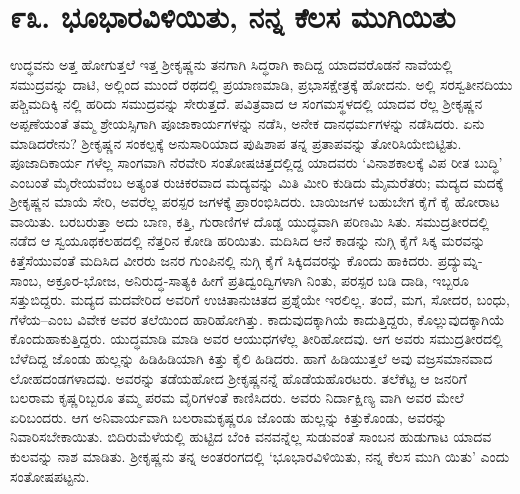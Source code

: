 
\chapter{೯೩. ಭೂಭಾರವಿಳಿಯಿತು, ನನ್ನ ಕೆಲಸ ಮುಗಿಯಿತು}

ಉದ್ಧವನು ಅತ್ತ ಹೋಗುತ್ತಲೆ ಇತ್ತ ಶ್ರೀಕೃಷ್ಣನು ತನಗಾಗಿ ಸಿದ್ಧರಾಗಿ ಕಾದಿದ್ದ ಯಾದವರೊಡನೆ ನಾವೆಯಲ್ಲಿ ಸಮುದ್ರವನ್ನು ದಾಟಿ, ಅಲ್ಲಿಂದ ಮುಂದೆ ರಥದಲ್ಲಿ ಪ್ರಯಾಣಮಾಡಿ, ಪ್ರಭಾಸಕ್ಷೇತ್ರಕ್ಕೆ ಹೋದನು. ಅಲ್ಲಿ ಸರಸ್ವತೀನದಿಯು ಪಶ್ಚಿಮದಿಕ್ಕಿ ನಲ್ಲಿ ಹರಿದು ಸಮುದ್ರವನ್ನು ಸೇರುತ್ತದೆ. ಪವಿತ್ರವಾದ ಆ ಸಂಗಮಸ್ಥಳದಲ್ಲಿ ಯಾದವ ರೆಲ್ಲ ಶ್ರೀಕೃಷ್ಣನ ಅಪ್ಪಣೆಯಂತೆ ತಮ್ಮ ಶ್ರೇಯಸ್ಸಿಗಾಗಿ ಪೂಜಾಕಾರ್ಯಗಳನ್ನು ನಡೆಸಿ, ಅನೇಕ ದಾನಧರ್ಮಗಳನ್ನು ನಡೆಸಿದರು. ಏನು ಮಾಡಿದರೇನು? ಶ್ರೀಕೃಷ್ಣನ ಸಂಕಲ್ಪಕ್ಕೆ ಅನುಸಾರಿಯಾದ ಪುಷಿಶಾಪ ತನ್ನ ಪ್ರತಾಪವನ್ನು ತೋರಿಸಿಯೇಬಿಟ್ಟಿತು. ಪೂಜಾದಿಕಾರ್ಯ ಗಳೆಲ್ಲ ಸಾಂಗವಾಗಿ ನೆರವೇರಿ ಸಂತೋಷಚಿತ್ತದಲ್ಲಿದ್ದ ಯಾದವರು ‘ವಿನಾಶಕಾಲಕ್ಕೆ ವಿಪ ರೀತ ಬುದ್ಧಿ’ ಎಂಬಂತೆ ಮೈರೇಯವೆಂಬ ಅತ್ಯಂತ ರುಚಿಕರವಾದ ಮದ್ಯವನ್ನು ಮಿತಿ ಮೀರಿ ಕುಡಿದು ಮೈಮರೆತರು; ಮದ್ಯದ ಮದಕ್ಕೆ ಶ್ರೀಕೃಷ್ಣನ ಮಾಯೆ ಸೇರಿ, ಅವರೆಲ್ಲ ಪರಸ್ಪರ ಜಗಳಕ್ಕೆ ಪ್ರಾರಂಭಿಸಿದರು. ಬಾಯಿಜಗಳ ಬಹುಬೇಗ ಕೈಗೆ ಕೈ ಹೋರಾಟ ವಾಯಿತು. ಬರಬರುತ್ತಾ ಅದು ಬಾಣ, ಕತ್ತಿ, ಗುರಾಣಿಗಳ ದೊಡ್ಡ ಯುದ್ಧವಾಗಿ ಪರಿಣಮಿ ಸಿತು. ಸಮುದ್ರತೀರದಲ್ಲಿ ನಡೆದ ಆ ಸ್ವಯೂಥಕಲಹದಲ್ಲಿ ನೆತ್ತರಿನ ಕೋಡಿ ಹರಿಯಿತು. ಮದಿಸಿದ ಆನೆ ಕಾಡನ್ನು ನುಗ್ಗಿ ಕೈಗೆ ಸಿಕ್ಕ ಮರವನ್ನು ಕಿತ್ತೆಸೆಯುವಂತೆ ಮದಿಸಿದ ವೀರರು ಜನರ ಗುಂಪಿನಲ್ಲಿ ನುಗ್ಗಿ ಕೈಗೆ ಸಿಕ್ಕಿದವರನ್ನು ಕೊಂದು ಹಾಕಿದರು. ಪ್ರದ್ಯುಮ್ನ-ಸಾಂಬ, ಅಕ್ರೂರ-ಭೋಜ, ಅನಿರುದ್ಧ-ಸಾತ್ಯಕಿ ಹೀಗೆ ಪ್ರತಿದ್ವಂದ್ವಿಗಳಾಗಿ ನಿಂತು, ಪರಸ್ಪರ ಬಡಿ ದಾಡಿ, ಇಬ್ಬರೂ ಸತ್ತುಬಿದ್ದರು. ಮದ್ಯದ ಮದವೇರಿದ ಅವರಿಗೆ ಉಚಿತಾನುಚಿತದ ಪ್ರಶ್ನೆಯೇ ಇರಲಿಲ್ಲ. ತಂದೆ, ಮಗ, ಸೋದರ, ಬಂಧು, ಗೆಳೆಯ–ಎಂಬ ವಿವೇಕ ಅವರ ತಲೆಯಿಂದ ಹಾರಿಹೋಗಿತ್ತು. ಕಾದುವುದಕ್ಕಾಗಿಯೆ ಕಾದುತ್ತಿದ್ದರು, ಕೊಲ್ಲುವುದಕ್ಕಾಗಿಯೆ ಕೊಂದುಹಾಕುತ್ತಿದ್ದರು. ಯುದ್ಧಮಾಡಿ ಮಾಡಿ ಅವರ ಆಯುಧಗಳೆಲ್ಲ ತೀರಿಹೋದವು. ಆಗ ಅವರು ಸಮುದ್ರತೀರದಲ್ಲಿ ಬೆಳೆದಿದ್ದ ಜೊಂಡು ಹುಲ್ಲನ್ನು ಹಿಡಿಹಿಡಿಯಾಗಿ ಕಿತ್ತು ಕೈಲಿ ಹಿಡಿದರು. ಹಾಗೆ ಹಿಡಿಯುತ್ತಲೆ ಅವು ವಜ್ರಸಮಾನವಾದ ಲೋಹದಂಡಗಳಾದವು. ಅವರನ್ನು ತಡೆಯಹೋದ ಶ್ರೀಕೃಷ್ಣನನ್ನೆ ಹೊಡೆಯಹೊರಟರು. ತಲೆಕೆಟ್ಟ ಆ ಜನರಿಗೆ ಬಲರಾಮ ಕೃಷ್ಣರಿಬ್ಬರೂ ತಮ್ಮ ಪರಮ ವೈರಿಗಳಂತೆ ಕಾಣಿಸಿದರು. ಅವರು ನಿರ್ದಾಕ್ಷಿಣ್ಯ ವಾಗಿ ಅವರ ಮೇಲೆ ಏರಿಬಂದರು. ಆಗ ಅನಿವಾರ್ಯವಾಗಿ ಬಲರಾಮಕೃಷ್ಣರೂ ಜೊಂಡು ಹುಲ್ಲನ್ನು ಕಿತ್ತುಕೊಂಡು, ಅವರನ್ನು ನಿವಾರಿಸಬೇಕಾಯಿತು. ಬಿದಿರುಮೆಳೆಯಲ್ಲಿ ಹುಟ್ಟಿದ ಬೆಂಕಿ ವನವನ್ನೆಲ್ಲ ಸುಡುವಂತೆ ಸಾಂಬನ ಹುಡುಗಾಟ ಯಾದವ ಕುಲವನ್ನು ನಾಶ ಮಾಡಿತು. ಶ್ರೀಕೃಷ್ಣನು ತನ್ನ ಅಂತರಂಗದಲ್ಲಿ ‘ಭೂಭಾರವಿಳಿಯಿತು, ನನ್ನ ಕೆಲಸ ಮುಗಿ ಯಿತು’ ಎಂದು ಸಂತೋಷಪಟ್ಟನು.

